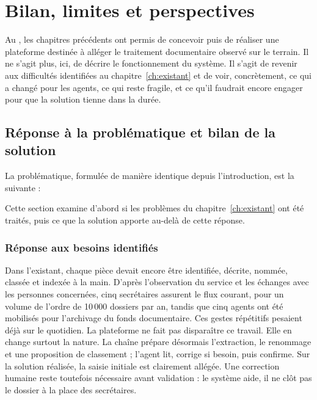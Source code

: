 \chapter{Bilan, limites et perspectives}
\label{ch:bilan}

Au \nomMinistere{}, les chapitres précédents ont permis de concevoir puis de réaliser une plateforme destinée à alléger le traitement documentaire observé sur le terrain. Il ne s'agit plus, ici, de décrire le fonctionnement du système. Il s'agit de revenir aux difficultés identifiées au chapitre~\ref{ch:existant} et de voir, concrètement, ce qui a changé pour les agents, ce qui reste fragile, et ce qu'il faudrait encore engager pour que la solution tienne dans la durée.

\section{Réponse à la problématique et bilan de la solution}

La problématique, formulée de manière identique depuis l'introduction, est la suivante :
\begin{quote}
\textbf{\problematiqueMemoire}
\end{quote}
Cette section examine d'abord si les problèmes du chapitre~\ref{ch:existant} ont été traités, puis ce que la solution apporte au-delà de cette réponse.

\subsection{Réponse aux besoins identifiés}

Dans l'existant, chaque pièce devait encore être identifiée, décrite, nommée, classée et indexée à la main. D'après l'observation du service et les échanges avec les personnes concernées, cinq secrétaires assurent le flux courant, pour un volume de l'ordre de 10\,000 dossiers par an, tandis que cinq agents ont été mobilisés pour l'archivage du fonds documentaire. Ces gestes répétitifs pesaient déjà sur le quotidien. La plateforme ne fait pas disparaître ce travail. Elle en change surtout la nature. La chaîne prépare désormais l'extraction, le renommage et une proposition de classement ; l'agent lit, corrige si besoin, puis confirme. Sur la solution réalisée, la saisie initiale est clairement allégée. Une correction humaine reste toutefois nécessaire avant validation : le système aide, il ne clôt pas le dossier à la place des secrétaires.


